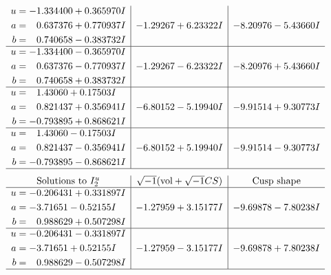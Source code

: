 \documentclass[1p]{elsarticle_modified}
\theoremstyle{definition}
\newcommand{\I}{\sqrt{-1}}
\begin{document}
$$\begin{array}{c|c|c}
\begin{aligned}
u &= -1.334400 + 0.365970 I \\
a &= \phantom{-}0.637376 + 0.770937 I \\
b &= \phantom{-}0.740658 - 0.383732 I\end{aligned}
 & -1.29267 + 6.23322 I & -8.20976 - 5.43660 I \\ \hline\begin{aligned}
u &= -1.334400 - 0.365970 I \\
a &= \phantom{-}0.637376 - 0.770937 I \\
b &= \phantom{-}0.740658 + 0.383732 I\end{aligned}
 & -1.29267 - 6.23322 I & -8.20976 + 5.43660 I \\ \hline\begin{aligned}
u &= \phantom{-}1.43060 + 0.17503 I \\
a &= \phantom{-}0.821437 + 0.356941 I \\
b &= -0.793895 + 0.868621 I\end{aligned}
 & -6.80152 - 5.19940 I & -9.91514 + 9.30773 I \\ \hline\begin{aligned}
u &= \phantom{-}1.43060 - 0.17503 I \\
a &= \phantom{-}0.821437 - 0.356941 I \\
b &= -0.793895 - 0.868621 I\end{aligned}
 & -6.80152 + 5.19940 I & -9.91514 - 9.30773 I\\
 \hline 
 \end{array}$$\newpage$$\begin{array}{c|c|c}  
\text{Solutions to }I^u_{2}& \I (\text{vol} + \sqrt{-1}CS) & \text{Cusp shape}\\
 \hline 
\begin{aligned}
u &= -0.206431 + 0.331897 I \\
a &= -3.71651 - 0.52155 I \\
b &= \phantom{-}0.988629 + 0.507298 I\end{aligned}
 & -1.27959 + 3.15177 I & -9.69878 - 7.80238 I \\ \hline\begin{aligned}
u &= -0.206431 - 0.331897 I \\
a &= -3.71651 + 0.52155 I \\
b &= \phantom{-}0.988629 - 0.507298 I\end{aligned}
 & -1.27959 - 3.15177 I & -9.69878 + 7.80238 I\\
 \hline 
 \end{array}$$\newpage
\end{document}
